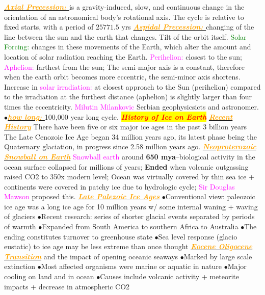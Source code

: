 \documentclass{article}
\newcommand{\ddd}{$\bullet$}
\newcommand{\red}[1]{\textcolor{red}{#1}}
\newcommand{\green}[1]{\textcolor{green}{#1}}
\newcommand{\pink}[1]{\textcolor{magenta}{#1}}
\newcommand{\orange}[1]{\textcolor{orange}{#1}}
\newcommand{\mysection}[1]{\colorbox{yellow}{{\textbf{\textbf{\textit{\red{#1}}}}}}}
\newcommand{\mysub}[1]{\underline{\textbf{{\textit{\orange{#1}}}}}}
\newcommand{\mysubsub}[1]{{{\green{#1}}}}
\newcommand{\vocab}[1]{{\pink{#1}}}
\begin{document}
\begin{multicols*}{4}
        \mysub{Axial Precession: } is a gravity-induced, slow, and continuous change in the orientation of an astronomical body's rotational axis. The cycle is relative to fixed starts, with a period of $25771.5$ yrs
        \mysub{Aspidal Precession: }changing of the line between the sun and the earth that changes. Tilt of the orbit itself. 
        \mysubsub{Solar Forcing: }changes in these movements of the Earth, which alter the amount and location of solar radiation reaching the Earth.
        \vocab{Perihelion: }closest to the sun; \vocab{Aphelion: }farthest from the sun; The semi-major axis is a constant, therefore when the earth orbit becomes more eccentric, the semi-minor axis shortens. Increase in \vocab{solar irradiation: }at closest approach to the Sun (perihelion) compared to the irradiation at the furthest distance (aphelion) is slightly larger than four times the eccentricity.
        \vocab{Milutin Milankovic} Serbian geophysicsicts and astronomer.
        \ddd \mysub{how long: }100,000 year long cycle. 
    \mysection{History of Ice on Earth}
    	\mysub{Recent History}
    	There have been five or six major ice ages in the past 3 billion years
    	The Late Cenozoic Ice Age began 34 million years ago, its latest phase being the Quaternary glaciation, in progress since 2.58 million years ago. 
        \mysub{Neoproterozoic Snowball on Earth} 
            \vocab{Snowball earth} around \textbf{650 mya}--biological activity in the ocean surface collapsed for millions of years; \textbf{Ended} when volcanic outgassing raised CO2 to 350x modern level; Ocean was virtually covered by thin sea ice + continents were covered in patchy ice due to hydrologic cycle; \vocab{Sir Douglas Mawson} proposed this. 
        \mysub{Late Palezoic Ice Ages}
            \ddd Conventional view: paleozoic ice age was a long ice age for 10 million years w/ some internal waning + waving of glaciers
            \ddd Recent research: series of shorter glacial events separated by periods of warmth
            \ddd Expanded from South America to southern Africa to Australia 
            \ddd The ending constitutes turnover to greenhouse state
            \ddd Sea level response (glacio eustatic) to ice age may be less extreme than once thought
        \mysub{Eocene Oligocene Transition} and the impact of opening oceanic seaways
            \ddd Marked by large scale extinction
            \ddd Most affected organisms were marine or aquatic in nature
            \ddd Major cooling on land and in ocean
            \ddd Causes include volcanic activity + meteorite impacts + decrease in atmospheric CO2

\end{multicols*}
\end{document}
